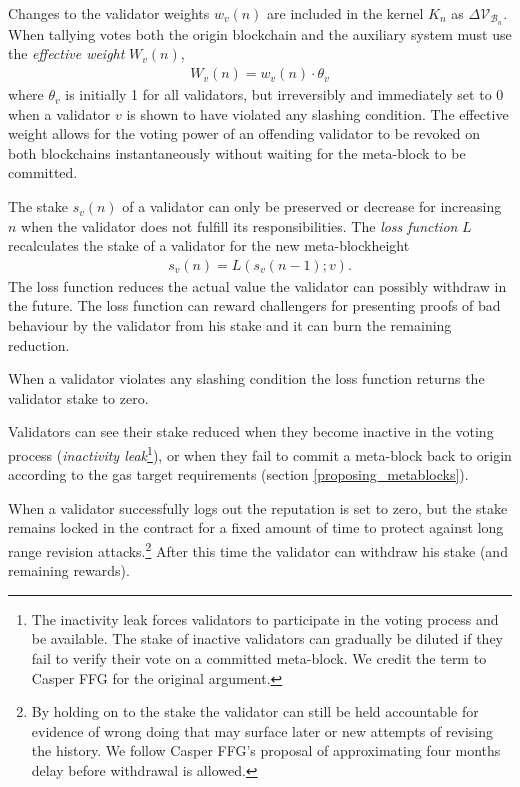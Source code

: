 \documentclass[12pt,a4paper]{article}
\begin{document}
Changes to the validator weights $w_v(n)$ are included in the kernel $K_n$ as $\Delta\mathcal{V}_{\mathcal{B}_n}$.  When tallying votes both the origin blockchain and the auxiliary system must use the \emph{effective weight} $W_v(n)$,
\begin{align*}
  W_v(n) = w_v(n) \cdot \theta_v
\end{align*}
where $\theta_v$ is initially 1 for all validators, but irreversibly and immediately set to 0 when a validator $v$ is shown to have violated any slashing condition.
The effective weight allows for the voting power of an offending validator to be revoked on both blockchains instantaneously without waiting for the meta-block to be committed.

The stake $s_v(n)$ of a validator can only be preserved or decrease for increasing $n$ when the validator does not fulfill its responsibilities.
The \emph{loss function} $L$ recalculates the stake of a validator for the new meta-blockheight
\begin{align}
  s_v(n) = L(s_v(n-1); v).
\end{align}
The loss function reduces the actual value the validator can possibly withdraw in the future.  The loss function can reward challengers for presenting proofs of bad behaviour by the validator from his stake and it can burn the remaining reduction.

When a validator violates any slashing condition the loss function returns the validator stake to zero.

Validators can see their stake reduced when they become inactive in the voting process (\emph{inactivity leak}\footnote{
  The inactivity leak forces validators to participate in the voting process and be available.
  The stake of inactive validators can gradually be diluted if they fail to verify their vote on a committed meta-block.
  We credit the term to Casper FFG\cite{casperffg} for the original argument.
}), or when they fail to commit a meta-block back to origin according to the gas target requirements (section  \ref{proposing_metablocks}).

When a validator successfully logs out the reputation is set to zero, but the stake remains locked in the contract for a fixed amount of time to protect against long range revision attacks.\footnote{
  By holding on to the stake the validator can still be held accountable for evidence of wrong doing that may surface later or new attempts of revising the history.
  We follow Casper FFG's proposal of approximating four months delay before withdrawal is allowed.}
After this time the validator can withdraw his stake (and remaining rewards).
\end{document}
